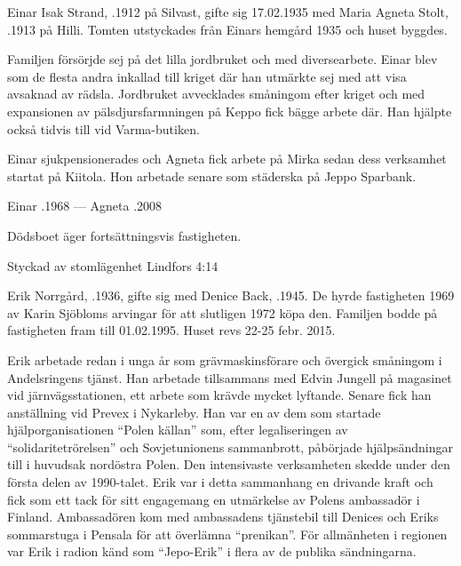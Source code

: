 Einar Isak Strand, .1912 på Silvast, gifte sig 17.02.1935 med Maria Agneta Stolt, .1913 på Hilli. Tomten utstyckades från Einars hemgård 1935 och huset byggdes.

Familjen försörjde sej på det lilla jordbruket och med diversearbete. Einar blev som de flesta andra inkallad till kriget där han utmärkte sej med att visa avsaknad av rädsla. Jordbruket avvecklades småningom efter kriget och med expansionen av pälsdjursfarmningen på Keppo fick bägge arbete där. Han hjälpte också tidvis till vid Varma-butiken.

Einar sjukpensionerades och Agneta fick arbete på Mirka sedan dess verksamhet startat på Kiitola. Hon arbetade senare som städerska på Jeppo Sparbank.
\begin{jhchildren}
  \item {}
  \item {}
  \item {}
  \item {}
\end{jhchildren}

Einar .1968  ---  Agneta .2008

Dödsboet äger fortsättningsvis fastigheten.




Styckad av stomlägenhet Lindfors 4:14


Erik Norrgård, .1936, gifte sig med Denice Back, .1945. De hyrde fastigheten 1969 av Karin Sjöbloms arvingar för att slutligen 1972 köpa den. Familjen bodde på fastigheten fram till 01.02.1995. Huset revs 22-25 febr. 2015.

Erik arbetade redan i unga år som grävmaskinsförare och övergick småningom i Andelsringens tjänst. Han arbetade tillsammans med Edvin Jungell på magasinet vid järnvägsstationen, ett arbete som krävde mycket lyftande.  Senare fick han anställning vid Prevex i Nykarleby. Han var en av dem som startade hjälporganisationen ``Polen källan'' som, efter legaliseringen av ``solidaritetrörelsen'' och Sovjetunionens sammanbrott, påbörjade hjälpsändningar till i huvudsak nordöstra Polen. Den intensivaste verksamheten skedde under den första delen av 1990-talet. Erik var i detta sammanhang en drivande kraft och fick som ett tack för sitt engagemang en utmärkelse av Polens ambassadör i Finland. Ambassadören kom med ambassadens tjänstebil till Denices och Eriks sommarstuga i Pensala för att överlämna ``prenikan''. För allmänheten i regionen var Erik i radion känd som ``Jepo-Erik'' i flera av de publika sändningarna.

